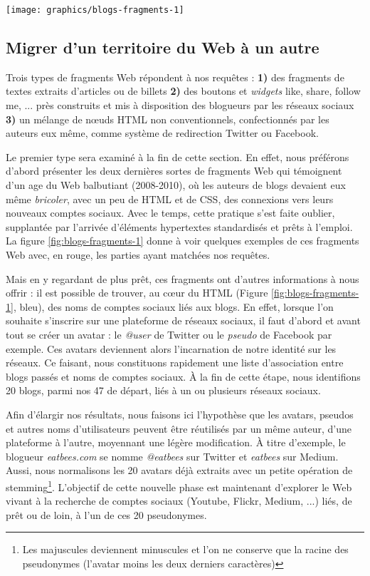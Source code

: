 \documentclass[symmetric,justified,marginals=raggedouter]{tufte-book}
\begin{document}
\begin{figure*}
  \texttt{[image: graphics/blogs-fragments-1]}
  \caption{Exemples de fragments Web associés à divers réseaux sociaux}
  \label{fig:blogs-fragments-1}
\end{figure*} 

\subsection{Migrer d'un territoire du Web à un autre}

\noindent Trois types de fragments Web répondent à nos requêtes : \textbf{1)} des fragments de textes extraits d'articles ou de billets \textbf{2)} des boutons et \textit{widgets} like, share, follow me, ... près construits et mis à disposition des blogueurs par les réseaux sociaux \textbf{3)} un mélange de nœuds HTML non conventionnels, confectionnés par les auteurs eux même, comme système de redirection Twitter ou Facebook. 

Le premier type sera examiné à la fin de cette section. En effet, nous préférons d'abord présenter les deux dernières sortes de fragments Web qui témoignent d'un age du Web balbutiant (2008-2010), où les auteurs de blogs devaient eux même \textit{bricoler}, avec un peu de HTML et de CSS, des connexions vers leurs nouveaux comptes sociaux. Avec le temps, cette pratique s'est faite oublier, supplantée par l'arrivée d'éléments hypertextes standardisés et prêts à l'emploi. La figure \ref{fig:blogs-fragments-1} donne à voir quelques exemples de ces fragments Web avec, en rouge, les parties ayant matchées nos requêtes. 

Mais en y regardant de plus prêt, ces fragments ont d'autres informations à nous offrir : il est possible de trouver, au cœur du HTML (Figure \ref{fig:blogs-fragments-1}, bleu), des noms de comptes sociaux liés aux blogs. En effet, lorsque l'on souhaite s'inscrire sur une plateforme de réseaux sociaux, il faut d'abord et avant tout se créer un avatar : le \textit{@user} de Twitter ou le \textit{pseudo} de Facebook par exemple. Ces avatars deviennent alors l'incarnation de notre identité sur les réseaux. Ce faisant, nous constituons rapidement une liste d'association entre blogs passés et noms de comptes sociaux. À la fin de cette étape, nous identifions 20 blogs, parmi nos 47 de départ, liés à un ou plusieurs réseaux sociaux.

Afin d'élargir nos résultats, nous faisons ici l'hypothèse que les avatars, pseudos et autres noms d'utilisateurs peuvent être réutilisés par un même auteur, d'une plateforme à l'autre, moyennant une légère modification. À titre d'exemple, le blogueur \textit{eatbees.com} se nomme \textit{@eatbees} sur Twitter et \textit{eatbees} sur Medium. Aussi, nous normalisons les 20 avatars déjà extraits avec un petite opération de stemming\footnote{Les majuscules deviennent minuscules et l'on ne conserve que la racine des pseudonymes (l'avatar moins les deux derniers caractères)}. L'objectif de cette nouvelle phase est maintenant d'explorer le Web vivant à la recherche de comptes sociaux (Youtube, Flickr, Medium, ...) liés, de prêt ou de loin, à l'un de ces 20 pseudonymes.   
\end{document}
